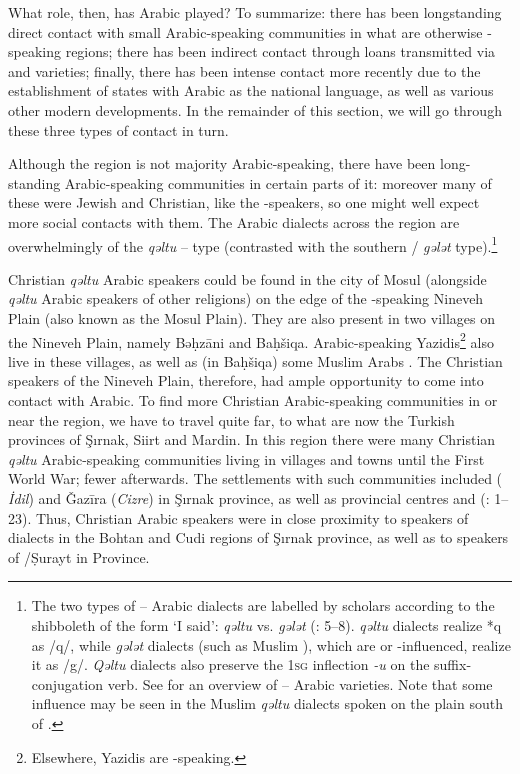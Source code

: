 \documentclass[output=paper]{langsci/langscibook}
\begin{document}
What role, then, has Arabic played? To summarize: there has been longstanding direct contact with small Arabic-speaking communities in what are otherwise -speaking regions; there has been indirect contact through loans transmitted via  and  varieties; finally, there has been intense contact more recently due to the establishment of states with Arabic as the national language, as well as various other modern developments. In the remainder of this section, we will go through these three types of contact in turn.

Although the region is not majority Arabic-speaking, there have been long-standing Arabic-speaking communities in certain parts of it: moreover many of these were Jewish and Christian, like the -speakers, so one might well expect more social contacts with them. The Arabic dialects across the region are overwhelmingly of the \textit{qəltu} – type (contrasted with the southern / \textit{gələt} type).\footnote{The two types of – Arabic dialects are labelled by scholars according to the shibboleth of the form ‘I said’: \textit{qəltu} vs. \textit{gələt} (\citealt{Blanc1964}: 5–8). \textit{qəltu} dialects realize *q as /q/, while \textit{gələt} dialects (such as Muslim ), which are  or -influenced, realize it as /g/. \textit{Qəltu} dialects also preserve the 1\textsc{sg} {inflection} \textit{-u} on the suffix-conjugation verb. See \citet{Talay2011} for an overview of -- Arabic varieties. Note that some  influence may be seen in the Muslim \textit{qəltu} dialects spoken on the plain south of  \citep[30]{Jastrow1978}.}

Christian \textit{qəltu} Arabic speakers could be found in the city of Mosul (alongside \textit{qəltu} Arabic speakers of other religions) on the edge of the -speaking Nineveh Plain (also known as the Mosul Plain). They are also present in two villages on the Nineveh Plain, namely Bəḥzāni and Baḥšiqa. Arabic-speaking Yazidis\footnote{Elsewhere, Yazidis are -speaking.} also live in these villages, as well as (in Baḥšiqa) some Muslim Arabs \citep[24]{Jastrow1978}. The Christian  speakers of the Nineveh Plain, therefore, had ample opportunity to come into contact with Arabic. To find more Christian Arabic-speaking communities in or near the  region, we have to travel quite far, to what are now the Turkish provinces of Şırnak, {Siirt} and {Mardin}. In this region there were many Christian \textit{qəltu} Arabic-speaking communities living in villages and towns until the First World War; fewer afterwards. The settlements with such communities included  ( \textit{İdil}) and Ǧazīra (\textit{Cizre}) in Şırnak province, as well as provincial centres  and  (\citealt{Jastrow1978}: 1–23). Thus, Christian Arabic speakers were in close proximity to speakers of  dialects in the Bohtan and Cudi regions of Şırnak province, as well as to speakers of /{Ṣurayt} in  Province.
\end{document}
